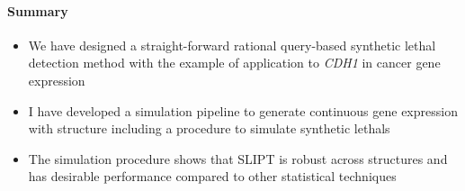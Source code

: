 \paragraph{Summary}

    \begin{itemize}
      \item We have designed a straight-forward rational query-based \gls{synthetic lethal} detection method with the example of application to \textit{CDH1} in cancer \gls{gene expression}
      
      \bigskip
      
      \item I have developed a simulation pipeline to generate continuous \gls{gene expression} with  structure including a procedure to simulate \glspl{synthetic lethal} 
      
      \bigskip
      
      \item The simulation procedure shows that SLIPT is robust across  structures and has desirable performance compared to other statistical techniques 
      \end{itemize}
\fi